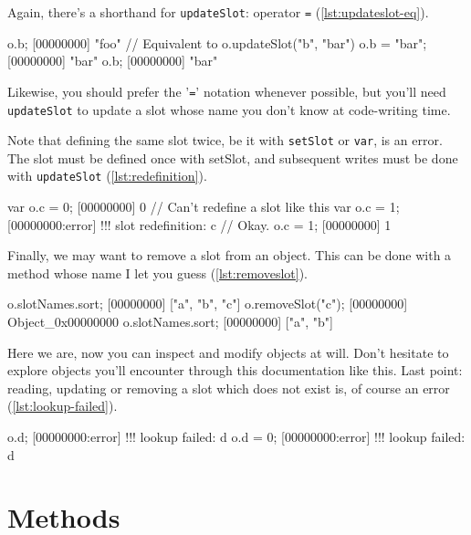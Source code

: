 \documentclass[openright,twoside,12pt]{report}
\begin{document}
Again, there's a shorthand for \texttt{updateSlot}: operator
\texttt{=} (\autoref{lst:updateslot-eq}).

\begin{urbiscript}[caption=Updating a slot with '\texttt{=}',
  label=lst:updateslot-eq, name=object-slots]
o.b;
[00000000] "foo"
// Equivalent to o.updateSlot("b", "bar")
o.b = "bar";
[00000000] "bar"
o.b;
[00000000] "bar"
\end{urbiscript}

Likewise, you should prefer the '\texttt{=}' notation whenever
possible, but you'll need \texttt{updateSlot} to update a slot whose
name you don't know at code-writing time.

Note that defining the same slot twice, be it with \texttt{setSlot} or
\texttt{var}, is an error. The slot must be defined once with setSlot,
and subsequent writes must be done with \texttt{updateSlot}
(\autoref{lst:redefinition}).

\begin{urbiscript}[caption=Defining a slot twice is an error,
  label=lst:redefinition, name=object-slots]
var o.c = 0;
[00000000] 0
// Can't redefine a slot like this
var o.c = 1;
[00000000:error] !!! slot redefinition: c
// Okay.
o.c = 1;
[00000000] 1
\end{urbiscript}

Finally, we may want to remove a slot from an object. This can be done
with a method whose name I let you guess (\autoref{lst:removeslot}).

\begin{urbiscript}[caption=Removing a slot, label=lst:removeslot,
  name=object-slots]
o.slotNames.sort;
[00000000] ["a", "b", "c"]
o.removeSlot("c");
[00000000] Object_0x00000000
o.slotNames.sort;
[00000000] ["a", "b"]
\end{urbiscript}

Here we are, now you can inspect and modify objects at will. Don't
hesitate to explore \urbi objects you'll encounter through this
documentation like this. Last point: reading, updating or removing a
slot which does not exist is, of course an error
(\autoref{lst:lookup-failed}).

\begin{urbiscript}[caption=Manipulating nonexistent slot is an error,
  label=lst:lookup-failed, name=object-slots]
o.d;
[00000000:error] !!! lookup failed: d
o.d = 0;
[00000000:error] !!! lookup failed: d
\end{urbiscript}

\section{Methods}
\end{document}
